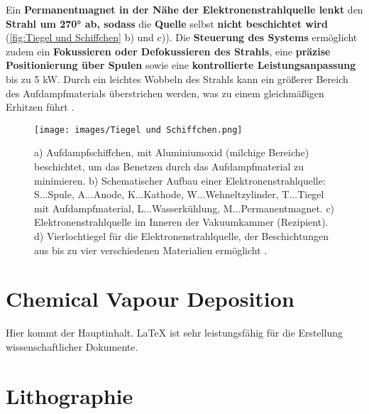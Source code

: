 \documentclass{article} %
\begin{document}
\vspace{1em}

Ein \textbf{Permanentmagnet in der Nähe der Elektronenstrahlquelle lenkt} den \textbf{Strahl um 270° ab, sodass} die \textbf{Quelle} selbst \textbf{nicht beschichtet wird} 
(\autoref{fig:Tiegel und Schiffchen} b) und c)). Die \textbf{Steuerung des Systems} ermöglicht zudem ein \textbf{Fokussieren oder Defokussieren des Strahls}, 
eine \textbf{präzise Positionierung über Spulen} sowie eine \textbf{kontrollierte Leistungsanpassung} bis zu 5 kW. Durch ein leichtes Wobbeln des Strahls kann 
ein größerer Bereich des Aufdampfmaterials überstrichen werden, was zu einem gleichmäßigen Erhitzen führt \cite{keplinger2024}.

\begin{figure}[ht]
    \centering
    \texttt{[image: images/Tiegel und Schiffchen.png]} %
    \captionsetup{labelfont=bf} %
    \caption{%
    a) Aufdampfschiffchen, mit Aluminiumoxid (milchige Bereiche) beschichtet, um das Benetzen durch das Aufdampfmaterial zu minimieren. 
    b) Schematischer Aufbau einer Elektronenstrahlquelle: S...Spule, A...Anode, K...Kathode, W...Wehneltzylinder, T...Tiegel mit Aufdampfmaterial, L...Wasserkühlung, M...Permanentmagnet.  
    c) Elektronenstrahlquelle im Inneren der Vakuumkammer (Rezipient). 
    d) Vierlochtiegel für die Elektronenstrahlquelle, der Beschichtungen aus bis zu vier verschiedenen Materialien ermöglicht \cite{keplinger2024}.
}
    \label{fig:Tiegel und Schiffchen}
\end{figure}

\vspace{1em}
\section{Chemical Vapour Deposition} %
Hier kommt der Hauptinhalt. \LaTeX{} ist sehr leistungsfähig für die Erstellung wissenschaftlicher Dokumente.

\vspace{1em}
\section{Lithographie} %

\newpage
\end{document}
